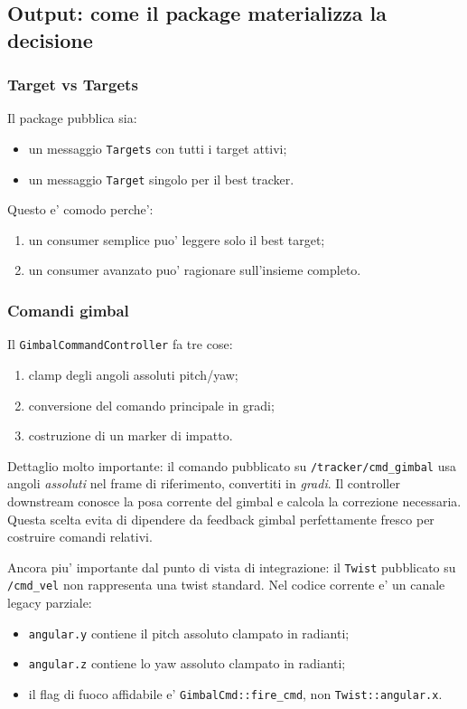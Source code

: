 \documentclass[11pt,a4paper]{article}
\newcommand{\code}[1]{\texttt{#1}}
\newcommand{\topic}[1]{\texttt{#1}}
\begin{document}
\subsection{Output: come il package materializza la decisione}

\subsubsection{Target vs Targets}

Il package pubblica sia:
\begin{itemize}[leftmargin=1.4em]
  \item un messaggio \code{Targets} con tutti i target attivi;
  \item un messaggio \code{Target} singolo per il best tracker.
\end{itemize}

Questo e' comodo perche':
\begin{enumerate}[leftmargin=1.4em]
  \item un consumer semplice puo' leggere solo il best target;
  \item un consumer avanzato puo' ragionare sull'insieme completo.
\end{enumerate}

\subsubsection{Comandi gimbal}

Il \code{GimbalCommandController} fa tre cose:
\begin{enumerate}[leftmargin=1.4em]
  \item clamp degli angoli assoluti pitch/yaw;
  \item conversione del comando principale in gradi;
  \item costruzione di un marker di impatto.
\end{enumerate}

Dettaglio molto importante: il comando pubblicato su \topic{/tracker/cmd_gimbal} usa angoli \emph{assoluti} nel frame di riferimento, convertiti in \emph{gradi}. Il controller downstream conosce la posa corrente del gimbal e calcola la correzione necessaria. Questa scelta evita di dipendere da feedback gimbal perfettamente fresco per costruire comandi relativi.

Ancora piu' importante dal punto di vista di integrazione: il \code{Twist} pubblicato su \topic{/cmd_vel} non rappresenta una twist standard. Nel codice corrente e' un canale legacy parziale:
\begin{itemize}[leftmargin=1.4em]
  \item \code{angular.y} contiene il pitch assoluto clampato in radianti;
  \item \code{angular.z} contiene lo yaw assoluto clampato in radianti;
  \item il flag di fuoco affidabile e' \code{GimbalCmd::fire\_cmd}, non \code{Twist::angular.x}.
\end{itemize}
\end{document}
